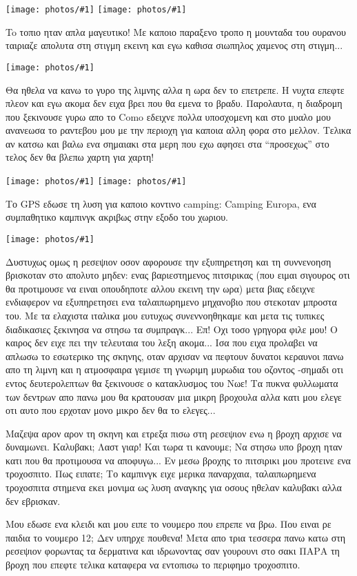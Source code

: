 \documentclass[]{book}
\newcommand\photo[1]{\noindent\texttt{[image: photos/\#1]}}
\begin{document}
\photo{12.jpg}
\photo{13.jpg}

To τοπιο ηταν απλα μαγευτικο! Με καποιο παραξενο τροπο η μουνταδα του ουρανου ταιριαζε απολυτα στη στιγμη εκεινη και εγω καθισα σιωπηλος χαμενος στη στιγμη...

\photo{14.jpg}

Θα ηθελα να κανω το γυρο της λιμνης αλλα η ωρα δεν το επετρεπε. Η νυχτα επεφτε πλεον και εγω ακομα δεν ειχα βρει που θα εμενα το βραδυ. Παρολαυτα, η διαδρομη που ξεκινουσε γυρω απο το Como εδειχνε πολλα υποσχομενη και στο μυαλο μου ανανεωσα το ραντεβου μου με την περιοχη για καποια αλλη φορα στο μελλον. Τελικα αν κατσω και βαλω ενα σημαιακι στα μερη που εχω αφησει στα ``προσεχως'' στο τελος δεν θα βλεπω χαρτη για χαρτη!

\photo{15.jpg}
\photo{16.jpg}

Το GPS εδωσε τη λυση για καποιο κοντινο camping: Camping Europa, ενα συμπαθητικο καμπινγκ ακριβως στην εξοδο του χωριου.

\photo{17.jpg}

Δυστυχως ομως η ρεσεψιον οσον αφορουσε την εξυπηρετηση και τη συννενοηση βρισκοταν στο απολυτο μηδεν: ενας βαριεστημενος πιτσιρικας (που ειμαι σιγουρος οτι θα προτιμουσε να ειναι οπουδηποτε αλλου εκεινη την ωρα) μετα βιας εδειχνε ενδιαφερον να εξυπηρετησει ενα ταλαιπωρημενο μηχανοβιο που στεκοταν μπροστα του.
Με τα ελαχιστα ιταλικα μου ευτυχως συνεννοηθηκαμε και μετα τις τυπικες διαδικασιες ξεκινησα να στησω τα συμπραγκ... Επ! Οχι τοσο γρηγορα φιλε μου! Ο καιρος δεν ειχε πει την τελευταια του λεξη ακομα...
Ισα που ειχα προλαβει να απλωσω το εσωτερικο της σκηνης, οταν αρχισαν να πεφτουν δυνατοι κεραυνοι πανω απο τη λιμνη και η ατμοσφαιρα γεμισε τη γνωριμη μυρωδια του οζοντος -σημαδι οτι εντος δευτερολεπτων θα ξεκινουσε ο κατακλυσμος του Νωε!
Τα πυκνα φυλλωματα των δεντρων απο πανω μου θα κρατουσαν μια μικρη βροχουλα αλλα κατι μου ελεγε οτι αυτο που ερχοταν μονο μικρο δεν θα το ελεγες... 

Μαζεψα αρον αρον τη σκηνη και ετρεξα πισω στη ρεσεψιον ενω η βροχη αρχισε να δυναμωνει. 
Καλυβακι; Λαστ γιαρ! Και τωρα τι κανουμε; Να στησω υπο βροχη ηταν κατι που θα προτιμουσα να αποφυγω...
Εν μεσω βροχης το πιτσιρικι μου προτεινε ενα τροχοσπιτο. Πως ειπατε; 
Το καμπινγκ ειχε μερικα παναρχαια, ταλαιπωρημενα τροχοσπιτα στημενα εκει μονιμα ως λυση αναγκης για οσους ηθελαν καλυβακι αλλα δεν εβρισκαν.

Μου εδωσε ενα κλειδι και μου ειπε το νουμερο που επρεπε να βρω. Που ειναι ρε παιδια το νουμερο 12; Δεν υπηρχε πουθενα! Μετα απο τρια τεσσερα πανω κατω στη ρεσεψιον φορωντας τα δερματινα και ιδρωνοντας σαν γουρουνι στο σακι ΠΑΡΑ τη βροχη που επεφτε τελικα καταφερα να εντοπισω το περιφημο τροχοσπιτο. 
\end{document}
